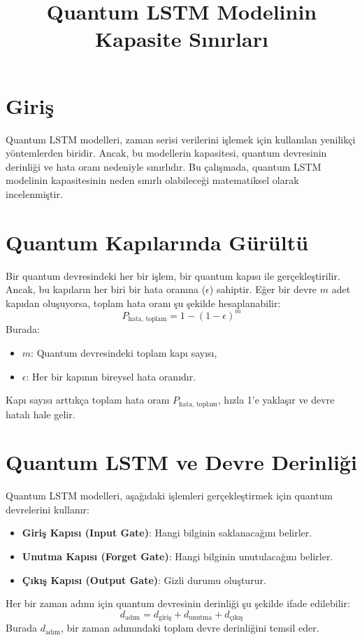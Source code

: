 \documentclass[a4paper,12pt]{article}
\title{Quantum LSTM Modelinin Kapasite Sınırları}
\author{}
\date{}
\begin{document}
\maketitle

\section*{Giriş}
Quantum LSTM modelleri, zaman serisi verilerini işlemek için kullanılan yenilikçi yöntemlerden biridir. Ancak, bu modellerin kapasitesi, quantum devresinin derinliği ve hata oranı nedeniyle sınırlıdır. Bu çalışmada, quantum LSTM modelinin kapasitesinin neden sınırlı olabileceği matematiksel olarak incelenmiştir.

\section*{Quantum Kapılarında Gürültü}
Bir quantum devresindeki her bir işlem, bir quantum kapısı ile gerçekleştirilir. Ancak, bu kapıların her biri bir hata oranına ($\epsilon$) sahiptir. Eğer bir devre $m$ adet kapıdan oluşuyorsa, toplam hata oranı şu şekilde hesaplanabilir:
\[
P_{\text{hata, toplam}} = 1 - (1 - \epsilon)^m
\]
Burada:
\begin{itemize}
    \item $m$: Quantum devresindeki toplam kapı sayısı,
    \item $\epsilon$: Her bir kapının bireysel hata oranıdır.
\end{itemize}
Kapı sayısı arttıkça toplam hata oranı $P_{\text{hata, toplam}}$, hızla 1'e yaklaşır ve devre hatalı hale gelir.

\section*{Quantum LSTM ve Devre Derinliği}
Quantum LSTM modelleri, aşağıdaki işlemleri gerçekleştirmek için quantum devrelerini kullanır:
\begin{itemize}
    \item \textbf{Giriş Kapısı (Input Gate)}: Hangi bilginin saklanacağını belirler.
    \item \textbf{Unutma Kapısı (Forget Gate)}: Hangi bilginin unutulacağını belirler.
    \item \textbf{Çıkış Kapısı (Output Gate)}: Gizli durumu oluşturur.
\end{itemize}

Her bir zaman adımı için quantum devresinin derinliği şu şekilde ifade edilebilir:
\[
d_{\text{adım}} = d_{\text{giriş}} + d_{\text{unutma}} + d_{\text{çıkış}}
\]
Burada $d_{\text{adım}}$, bir zaman adımındaki toplam devre derinliğini temsil eder.
\end{document}
